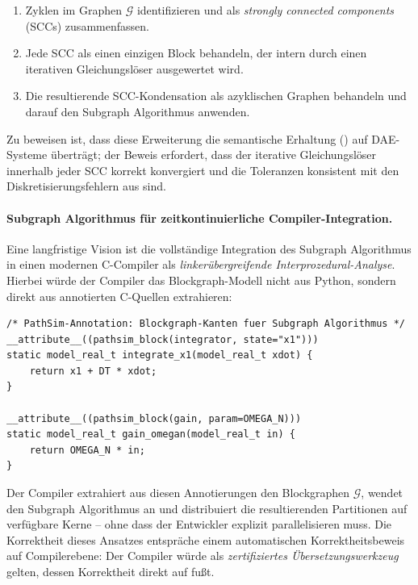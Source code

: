 ﻿\documentclass[12pt,a4paper]{article}
\theoremstyle{definition}
\begin{document}
\begin{enumerate}[label=(\roman*), nosep]
  \item Zyklen im Graphen $\mathcal{G}$ identifizieren und als
        \emph{strongly connected components} (SCCs) zusammenfassen.
  \item Jede SCC als einen einzigen Block behandeln, der intern
        durch einen iterativen Gleichungslöser ausgewertet wird.
  \item Die resultierende SCC-Kondensation als azyklischen Graphen
        behandeln und darauf den Subgraph Algorithmus anwenden.
\end{enumerate}

Zu beweisen ist, dass diese Erweiterung die semantische Erhaltung
() auf DAE-Systeme überträgt; der Beweis
erfordert, dass der iterative Gleichungslöser innerhalb jeder SCC
korrekt konvergiert und die Toleranzen konsistent mit den
Diskretisierungsfehlern aus  sind.

\paragraph{Subgraph Algorithmus für zeitkontinuierliche Compiler-Integration.}
Eine langfristige Vision ist die vollständige Integration des
Subgraph Algorithmus in einen modernen C-Compiler als
\emph{linkerübergreifende Interprozedural-Analyse}. Hierbei
würde der Compiler das Blockgraph-Modell nicht aus Python,
sondern direkt aus annotierten C-Quellen extrahieren:

\begin{lstlisting}[style=cstyle, caption={Annotiertes C-Format für den Subgraph Algorithmus}]
/* PathSim-Annotation: Blockgraph-Kanten fuer Subgraph Algorithmus */
__attribute__((pathsim_block(integrator, state="x1")))
static model_real_t integrate_x1(model_real_t xdot) {
    return x1 + DT * xdot;
}

__attribute__((pathsim_block(gain, param=OMEGA_N)))
static model_real_t gain_omegan(model_real_t in) {
    return OMEGA_N * in;
}
\end{lstlisting}

Der Compiler extrahiert aus diesen Annotierungen den Blockgraphen
$\mathcal{G}$, wendet den Subgraph Algorithmus an und distribuiert
die resultierenden Partitionen auf verfügbare Kerne -- ohne dass der
Entwickler explizit parallelisieren muss. Die Korrektheit dieses
Ansatzes entspräche einem automatischen Korrektheitsbeweis auf
Compilerebene: Der Compiler würde als \emph{zertifiziertes
Übersetzungswerkzeug} gelten, dessen Korrektheit direkt auf
 fußt.
\end{document}
